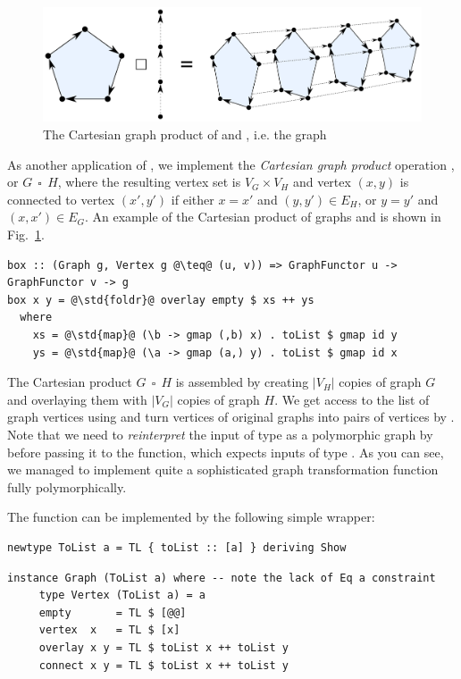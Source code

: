 \begin{figure}
\centerline{\includegraphics[scale=0.36]{fig/graph-product.pdf}}
\vspace{-4mm}
\caption{The Cartesian graph product of  and , i.e. the graph
\label{fig-product}}
\vspace{-3mm}
\end{figure}

As another application of , we implement the \emph{Cartesian graph
product} operation , or $G~~\square~~H$, where the resulting vertex set is
$V_G \times V_H$ and vertex $(x, y)$ is connected to vertex $(x', y')$ if
either $x = x'$ and $(y, y') \in E_H$, or $y = y'$ and $(x,x')\in E_G$. An example of the Cartesian product of graphs 
and  is shown in Fig.~\ref{fig-product}.

\begin{verbatim}
box :: (Graph g, Vertex g @\teq@ (u, v)) => GraphFunctor u -> GraphFunctor v -> g
box x y = @\std{foldr}@ overlay empty $ xs ++ ys
  where
    xs = @\std{map}@ (\b -> gmap (,b) x) . toList $ gmap id y
    ys = @\std{map}@ (\a -> gmap (a,) y) . toList $ gmap id x
\end{verbatim}

The Cartesian product $G~~\square~~H$ is assembled by creating $|V_H|$ copies
of graph $G$ and overlaying them with $|V_G|$ copies of graph $H$. We get
access to the list of graph vertices using  and turn vertices of
original graphs into pairs of vertices by . Note that we need to
\emph{reinterpret} the input of type  as a polymorphic graph
by  before passing it to the  function, which expects
inputs of type . As you can see, we managed to implement quite
a sophisticated graph transformation function  fully polymorphically.

The  function can be implemented by the following simple 
wrapper:

\begin{verbatim}
newtype ToList a = TL { toList :: [a] } deriving Show
\end{verbatim}
\vspace{1mm}
\begin{verbatim}
instance Graph (ToList a) where -- note the lack of Eq a constraint
     type Vertex (ToList a) = a
     empty       = TL $ [@@]
     vertex  x   = TL $ [x]
     overlay x y = TL $ toList x ++ toList y
     connect x y = TL $ toList x ++ toList y
\end{verbatim}

